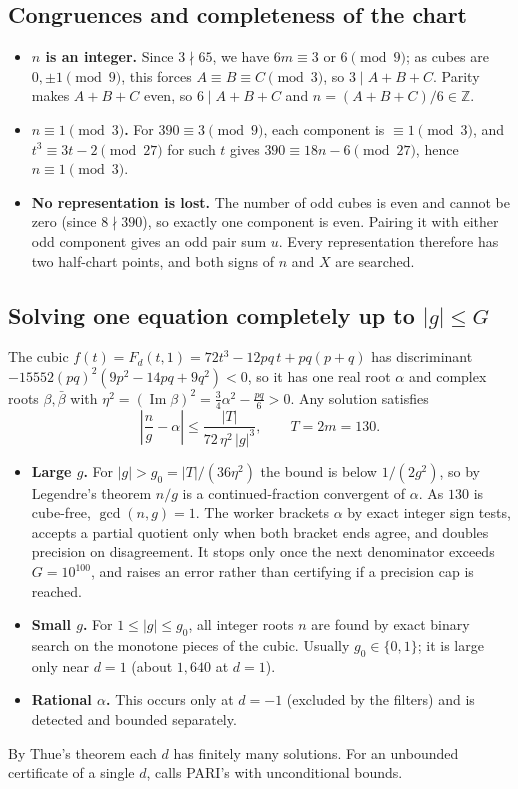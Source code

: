 \documentclass[11pt,a4paper]{article}
\newcommand{\code}[1]{\path{#1}}
\begin{document}
\subsection{Congruences and completeness of the chart}
\begin{itemize}[leftmargin=*]
  \item \textbf{$n$ is an integer.} Since $3\nmid65$, we have $6m\equiv3$ or $6\pmod 9$; as cubes
  are $0,\pm1\pmod 9$, this forces $A\equiv B\equiv C\pmod3$, so $3\mid A+B+C$. Parity makes
  $A+B+C$ even, so $6\mid A+B+C$ and $n=(A+B+C)/6\in\mathbb{Z}$.
  \item \textbf{$n\equiv1\pmod3$.} For $390\equiv3\pmod 9$, each component is $\equiv1\pmod3$,
  and $t^3\equiv3t-2\pmod{27}$ for such $t$ gives $390\equiv18n-6\pmod{27}$, hence $n\equiv1\pmod3$.
  \item \textbf{No representation is lost.} The number of odd cubes is even and cannot be zero
  (since $8\nmid390$), so exactly one component is even. Pairing it with either odd component
  gives an odd pair sum $u$. Every representation therefore has two half-chart points, and
  both signs of $n$ and $X$ are searched.
\end{itemize}

\subsection{Solving one equation completely up to $|g|\le G$}
The cubic $f(t)=F_d(t,1)=72t^3-12pq\,t+pq(p+q)$ has discriminant
$-15552(pq)^2(9p^2-14pq+9q^2)<0$, so it has one real root $\alpha$ and complex roots
$\beta,\bar\beta$ with $\eta^2=(\operatorname{Im}\beta)^2=\tfrac34\alpha^2-\tfrac{pq}{6}>0$.
Any solution satisfies
\begin{equation}
  \left|\frac ng-\alpha\right|\le\frac{|T|}{72\,\eta^2\,|g|^3},\qquad T=2m=130.
\end{equation}
\begin{itemize}[leftmargin=*]
  \item \textbf{Large $g$.} For $|g|>g_0=|T|/(36\eta^2)$ the bound is below $1/(2g^2)$, so by
  Legendre's theorem $n/g$ is a continued-fraction convergent of $\alpha$. As $130$ is
  cube-free, $\gcd(n,g)=1$. The worker brackets $\alpha$ by exact integer sign tests, accepts a
  partial quotient only when both bracket ends agree, and doubles precision on disagreement.
  It stops only once the next denominator exceeds $G=10^{100}$, and raises an error rather than
  certifying if a precision cap is reached.
  \item \textbf{Small $g$.} For $1\le|g|\le g_0$, all integer roots $n$ are found by exact binary
  search on the monotone pieces of the cubic. Usually $g_0\in\{0,1\}$; it is large only near
  $d=1$ (about $1{,}640$ at $d=1$).
  \item \textbf{Rational $\alpha$.} This occurs only at $d=-1$ (excluded by the filters) and is
  detected and bounded separately.
\end{itemize}
By Thue's theorem each $d$ has finitely many solutions. For an unbounded certificate of a
single $d$, \code{tools/certify_d.gp} calls PARI's \code{thue()} with unconditional bounds.
\end{document}
